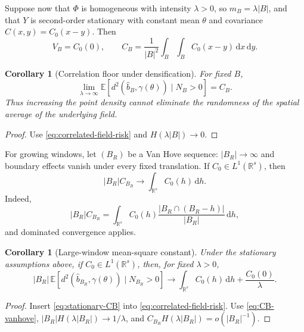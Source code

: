 \documentclass[11pt,a4paper]{article}
\newtheorem{corollary}[theorem]{Corollary}
\theoremstyle{remark}
\newcommand{\R}{\mathbb R}
\newcommand{\EE}{\mathbb E}
\begin{document}
Suppose now that \(\Phi\) is homogeneous with intensity \(\lambda>0\), so \(m_B=\lambda|B|\), and that \(Y\) is second-order stationary with constant mean \(\theta\) and covariance \(C(x,y)=C_0(x-y)\).  Then
\begin{equation}
\label{eq:stationary-CB}
 V_B=C_0(0),
 \qquad
 C_B=\frac1{|B|^2}\int_B\int_B C_0(x-y)\,\mathrm dx\,\mathrm dy.
\end{equation}

\begin{corollary}[Correlation floor under densification]
\label{cor:densification-floor}
For fixed \(B\),
\begin{equation}
\label{eq:density-limit}
 \lim_{\lambda\to\infty}
 \EE[d^2(\widehat b_B,\gamma(\theta))\mid N_B>0]
 =C_B.
\end{equation}
Thus increasing the point density cannot eliminate the randomness of the spatial average of the underlying field.
\end{corollary}

\begin{proof}
Use \eqref{eq:correlated-field-risk} and \(H(\lambda|B|)\to0\).
\end{proof}

For growing windows, let \((B_R)\) be a Van Hove sequence: \(|B_R|\to\infty\) and boundary effects vanish under every fixed translation.  If \(C_0\in L^1(\R^s)\), then
\begin{equation}
\label{eq:CB-vanhove}
 |B_R|C_{B_R}\longrightarrow \int_{\R^s}C_0(h)\,\mathrm dh.
\end{equation}
Indeed,
\[
 |B_R|C_{B_R}
 =\int_{\R^s}C_0(h)
 \frac{|B_R\cap(B_R-h)|}{|B_R|}\,\mathrm dh,
\]
and dominated convergence applies.

\begin{corollary}[Large-window mean-square constant]
\label{cor:large-window}
Under the stationary assumptions above, if \(C_0\in L^1(\R^s)\), then, for fixed \(\lambda>0\),
\begin{equation}
\label{eq:large-window-limit}
 |B_R|\,
 \EE[d^2(\widehat b_{B_R},\gamma(\theta))\mid N_{B_R}>0]
 \longrightarrow
 \int_{\R^s}C_0(h)\,\mathrm dh+\frac{C_0(0)}{\lambda}.
\end{equation}
\end{corollary}

\begin{proof}
Insert \eqref{eq:stationary-CB} into \eqref{eq:correlated-field-risk}.  Use \eqref{eq:CB-vanhove}, \(|B_R|H(\lambda|B_R|)\to1/\lambda\), and \(C_{B_R}H(\lambda|B_R|)=o(|B_R|^{-1})\).
\end{proof}
\end{document}
